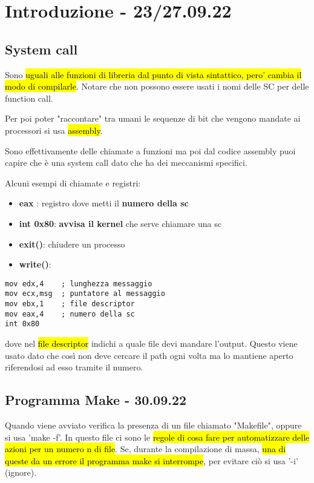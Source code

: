 
\section{Introduzione - 23/27.09.22}

\subsection{System call}

Sono \hl{uguali alle funzioni di libreria dal punto di vista sintattico, pero' cambia il modo di compilarle}. Notare che non possono essere usati i nomi delle SC per delle function call.

Per poi poter "raccontare" tra umani le sequenze di bit che vengono mandate ai processori si usa \hl{assembly}.

Sono effettivamente delle chiamate a funzioni ma poi dal codice assembly puoi capire che è una system call dato che ha dei meccanismi specifici.

Alcuni esempi di chiamate e registri:
\begin{itemize}
	\item \textbf{eax} : registro dove metti il \textbf{numero della sc}
	\item \textbf{int 0x80}: \textbf{avvisa il kernel} che serve chiamare una sc
	\item \textbf{exit()}: chiudere un processo
	\item \textbf{write()}:
\end{itemize}

\begin{lstlisting}
mov edx,4    ; lunghezza messaggio
mov ecx,msg  ; puntatore al messaggio
mov ebx,1    ; file descriptor
mov eax,4    ; numero della sc
int 0x80	
\end{lstlisting}

dove nel \hl{file descriptor} indichi a quale file devi mandare l'output. Questo viene usato dato che così non deve cercare il path ogni volta ma lo mantiene aperto riferendosi ad esso tramite il numero.


\subsection{Programma Make - 30.09.22}

Quando viene avviato verifica la presenza di un file chiamato "Makefile", oppure si usa 'make -f'. In questo file ci sono le \hl{regole di cosa fare per automatizzare delle azioni per un numero n di file}. Se, durante la compilazione di massa, \hl{una di queste da un errore il programma make si interrompe}, per evitare ciò si usa '-i' (ignore).

